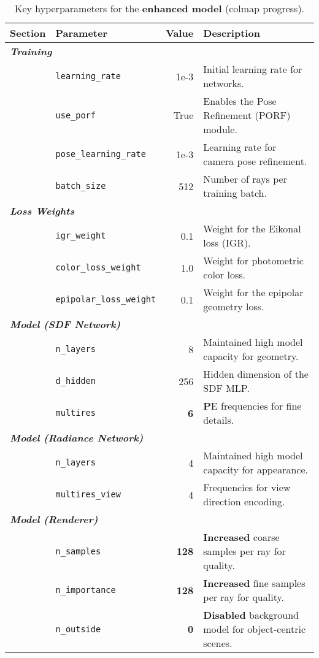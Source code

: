\documentclass{article}
\begin{document}
\begin{table}[h!]
    \centering
    \captionsetup{justification=centering}
    \captionsetup{justification=centering}
    \caption{Key hyperparameters for the \textbf{enhanced model} (colmap progress).}
    \label{tab:hyperparams_enhanced}
    \begin{tabular}{llrl}
        \toprule
        \textbf{Section} & \textbf{Parameter} & \textbf{Value} & \textbf{Description} \\
        \midrule
        \multicolumn{4}{l}{\textit{\textbf{Training}}} \\
        & \texttt{learning\_rate} & 1e-3 & Initial learning rate for networks. \\
        & \texttt{use\_porf} & True & Enables the Pose Refinement (PORF) module. \\
        & \texttt{pose\_learning\_rate} & 1e-3 & Learning rate for camera pose refinement. \\
        & \texttt{batch\_size} & 512 & Number of rays per training batch. \\
        \midrule
        \multicolumn{4}{l}{\textit{\textbf{Loss Weights}}} \\
        & \texttt{igr\_weight} & 0.1 & Weight for the Eikonal loss (IGR). \\
        & \texttt{color\_loss\_weight} & 1.0 & Weight for photometric color loss. \\
        & \texttt{epipolar\_loss\_weight} & 0.1 & Weight for the epipolar geometry loss. \\
        \midrule
        \multicolumn{4}{l}{\textit{\textbf{Model (SDF Network)}}} \\
        & \texttt{n\_layers} & 8 & Maintained high model capacity for geometry. \\
        & \texttt{d\_hidden} & 256 & Hidden dimension of the SDF MLP. \\
        & \texttt{multires} & \textbf 6 & \textbf PE frequencies for fine details. \\
        \midrule
        \multicolumn{4}{l}{\textit{\textbf{Model (Radiance Network)}}} \\
        & \texttt{n\_layers} & 4 & Maintained high model capacity for appearance. \\
        & \texttt{multires\_view} & 4 & Frequencies for view direction encoding. \\
        \midrule
        \multicolumn{4}{l}{\textit{\textbf{Model (Renderer)}}} \\
        & \texttt{n\_samples} & \textbf{128} & \textbf{Increased} coarse samples per ray for quality. \\
        & \texttt{n\_importance} & \textbf{128} & \textbf{Increased} fine samples per ray for quality. \\
        & \texttt{n\_outside} & \textbf{0} & \textbf{Disabled} background model for object-centric scenes. \\
        \bottomrule
    \end{tabular}
\end{table}
\end{document}
